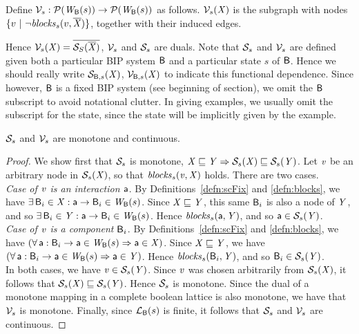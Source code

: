 \begin{definition}[$\VFsymb_s$]  \label{defn:violFix}
Define $\mathcal{V}_s: \mathcal{P}(\mathit{W}_{\mathsf{B}}({s})) \to \mathcal{P}(\mathit{W}_{\mathsf{B}}({s}))$ as follows.
$\mathcal{V}_{s}(\mathit{X})$ is the subgraph with nodes
$\{ v ~|~ \neg \mathit{blocks}_{s}(v, \overline{\mathit{\mathit{X}}}) \}$, together with their induced edges.
\end{definition}
%
Hence $\mathcal{V}_{s}(\mathit{X}) = \overline{\mathcal{S}_{S}(\overline{\mathit{X}})}$, \ie $\VFsymb_s$ and $\mathcal{S}_s$ are duals.
Note that $\mathcal{S}_s$ and $\VFsymb_s$ are defined given both a particular BIP system 
$\mathsf{B}$ and a particular state $s$ of $\mathsf{B}$. Hence we should really write 
$\mathcal{S}_{\mathsf{B},s}(\mathit{X})$, $\mathcal{V}_{\mathsf{B},s}(\mathit{X})$ to indicate this functional dependence. 
Since however, 
$\mathsf{B}$ is a fixed BIP system (see beginning of section), we omit the $\mathsf{B}$ subscript to avoid notational clutter.
In giving examples, we usually omit the subscript for the state, since the state will be implicitly given by the example.


\begin{proposition} \label{prop:monotone}
$\mathcal{S}_s$ and $\VFsymb_s$ are monotone and continuous.
\end{proposition}
%
\begin{proof}
We show first that $\mathcal{S}_s$ is monotone, \ie $\mathit{X} \sqsubseteq \mathit{Y} \Rightarrow \mathcal{S}_{s}(\mathit{X}) \sqsubseteq \mathcal{S}_{s}(\mathit{Y})$.
Let $\mathit{v}$ be an arbitrary node in $\mathcal{S}_{s}(\mathit{X})$, so that $\mathit{blocks}_{s}(\mathit{v}, \mathit{X})$ holds. There are two cases.\\

\emph{Case of $\mathit{v}$ is an interaction $\mathsf{a}$}. By Definitions~\ref{defn:scFix} and \ref{defn:blocks}, we have $\exists\, \mathsf{B}_i \in \mathit{X}  : \mathsf{a} \rightarrow \mathsf{B}_i \in \mathit{W}_{\mathsf{B}}({s})$.
Since $\mathit{X} \sqsubseteq \mathit{Y}$, this same $\mathsf{B}_i$ is also a node of $\mathit{Y}$, and so  $\exists\, \mathsf{B}_i \in \mathit{Y}  : \mathsf{a} \rightarrow \mathsf{B}_i \in \mathit{W}_{\mathsf{B}}({s})$. 
Hence  $\mathit{blocks}_{s}(\mathsf{a}, \mathit{Y})$, and so $\mathsf{a} \in \mathcal{S}_{s}(\mathit{Y})$. \\

\emph{Case of $\mathit{v}$ is a component $\mathsf{B}_i$}. By Definitions~\ref{defn:scFix} and \ref{defn:blocks}, we have $(\forall\, \mathsf{a} : \mathsf{B}_i \rightarrow \mathsf{a} \in \mathit{W}_{\mathsf{B}}({s}) \Rightarrow \mathsf{a} \in \mathit{X})$.
Since $\mathit{X} \sqsubseteq \mathit{Y}$, we have  $(\forall\, \mathsf{a} : \mathsf{B}_i \rightarrow \mathsf{a} \in \mathit{W}_{\mathsf{B}}({s}) \Rightarrow \mathsf{a} \in \mathit{Y})$. 
Hence $\mathit{blocks}_{s}(\mathsf{B}_i, \mathit{Y})$, and so $\mathsf{B}_i \in \mathcal{S}_{s}(\mathit{Y})$. \\

In both cases, we have $\mathit{v} \in \mathcal{S}_{s}(\mathit{Y})$. Since $\mathit{v}$ was chosen arbitrarily from $\mathcal{S}_{s}(\mathit{X}) $, it follows that $\mathcal{S}_{s}(\mathit{X}) \sqsubseteq \mathcal{S}_{s}(\mathit{Y})$. Hence
$\mathcal{S}_s$ is monotone.
%
Since the dual of a monotone mapping in a complete boolean lattice is also monotone, we have that $\VFsymb_s$ is monotone.
%
Finally, since $\mathcal{L}_{\mathsf{B}}({s})$ is finite, it follows that $\mathcal{S}_s$ and $\VFsymb_s$ are continuous.
\end{proof}

